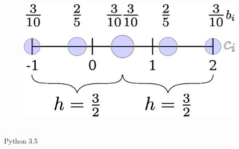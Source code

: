 \documentclass[10pt,a4paper]{article}
\begin{document}
       \begin{figure}[htbp]
	       	\centering
	       	\includegraphics[scale=0.3]{T13}
       \end{figure}\\ 
       Python 3.5
       \begin{mdframed}[linewidth=0pt,backgroundcolor=gray!10]
	   
	\end{mdframed}
\end{document}
